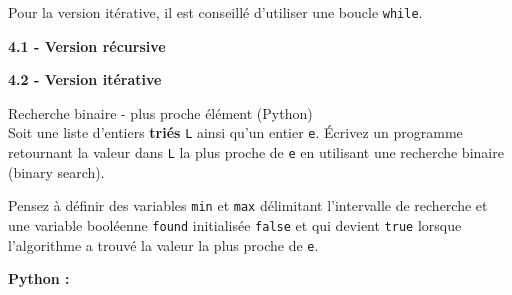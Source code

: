 \begin{Exercice}[20 minutes]
\begin{conseil}
        Pour la version itérative, il est conseillé d'utiliser une boucle \lstinline{while}.

    \end{conseil}

    \begin{solution}
        \textbf{4.1 - Version récursive}
        
    \end{solution}
    \begin{solution}
        \textbf{4.2 - Version itérative}
        
    \end{solution}

\end{Exercice}


\begin{Exercice}[15 minutes] Recherche binaire - plus proche élément (Python)\\

Soit une liste d’entiers \textbf{triés} \lstinline{L} ainsi qu’un entier \lstinline{e}. Écrivez un programme retournant la valeur dans \lstinline{L} la plus proche de \lstinline{e} en utilisant une recherche binaire (binary search).\\



\begin{conseil}
    Pensez à définir des variables \lstinline{min} et \lstinline{max} délimitant l'intervalle de recherche et une variable booléenne \lstinline{found} initialisée \lstinline{false} et qui devient \lstinline{true} lorsque l'algorithme a trouvé la valeur la plus proche de \lstinline{e}. 
    
\end{conseil}

    \begin{solution}
        \textbf{Python :}
        
    \end{solution}

\end{Exercice}

